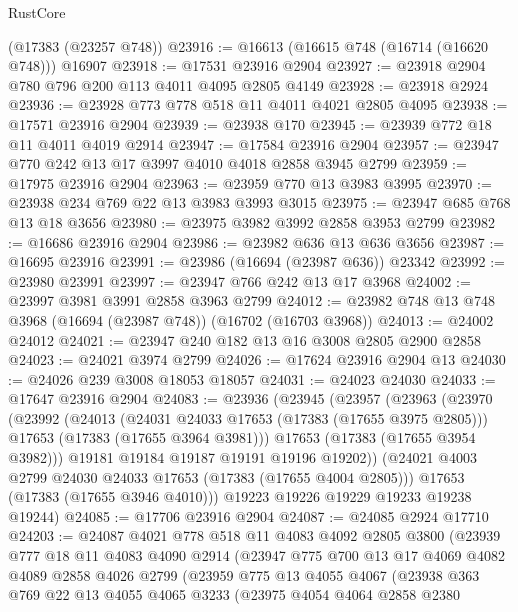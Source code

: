 \begin{lexlean}{RustCore}
\begin{coremodule}
    (@17383 (@23257 @748))
@23916 := @16613 (@16615 @748 (@16714 (@16620 @748))) @16907
@23918 := @17531 @23916 @2904
@23927 := @23918 @2904 @780 @796 @200 @113 @4011 @4095 @2805 @4149
@23928 := @23918 @2924
@23936 := @23928 @773 @778 @518 @11 @4011 @4021 @2805 @4095
@23938 := @17571 @23916 @2904
@23939 := @23938 @170
@23945 := @23939 @772 @18 @11 @4011 @4019 @2914
@23947 := @17584 @23916 @2904
@23957 := @23947 @770 @242 @13 @17 @3997 @4010 @4018 @2858 @3945 @2799
@23959 := @17975 @23916 @2904
@23963 := @23959 @770 @13 @3983 @3995
@23970 := @23938 @234 @769 @22 @13 @3983 @3993 @3015
@23975 := @23947 @685 @768 @13 @18 @3656
@23980 := @23975 @3982 @3992 @2858 @3953 @2799
@23982 := @16686 @23916 @2904
@23986 := @23982 @636 @13 @636 @3656
@23987 := @16695 @23916
@23991 := @23986 (@16694 (@23987 @636)) @23342
@23992 := @23980 @23991
@23997 := @23947 @766 @242 @13 @17 @3968
@24002 := @23997 @3981 @3991 @2858 @3963 @2799
@24012 := @23982 @748 @13 @748 @3968 (@16694 (@23987 @748)) (@16702 (@16703 @3968))
@24013 := @24002 @24012
@24021 := @23947 @240 @182 @13 @16 @3008 @2805 @2900 @2858
@24023 := @24021 @3974 @2799
@24026 := @17624 @23916 @2904 @13
@24030 := @24026 @239 @3008 @18053 @18057
@24031 := @24023 @24030
@24033 := @17647 @23916 @2904
@24083 := @23936
    (@23945
      (@23957
        (@23963
          (@23970
            (@23992
              (@24013
                (@24031 @24033 @17653 (@17383 (@17655 @3975 @2805)))
                @17653
                (@17383 (@17655 @3964 @3981)))
              @17653
              (@17383 (@17655 @3954 @3982)))
            @19181
            @19184
            @19187
            @19191
            @19196
            @19202))
        (@24021 @4003 @2799 @24030 @24033 @17653 (@17383 (@17655 @4004 @2805)))
        @17653
        (@17383 (@17655 @3946 @4010)))
      @19223
      @19226
      @19229
      @19233
      @19238
      @19244)
@24085 := @17706 @23916 @2904
@24087 := @24085 @2924 @17710
@24203 := @24087
    @4021
    @778
    @518
    @11
    @4083
    @4092
    @2805
    @3800
    (@23939
      @777
      @18
      @11
      @4083
      @4090
      @2914
      (@23947
        @775
        @700
        @13
        @17
        @4069
        @4082
        @4089
        @2858
        @4026
        @2799
        (@23959
          @775
          @13
          @4055
          @4067
          (@23938
            @363
            @769
            @22
            @13
            @4055
            @4065
            @3233
            (@23975
              @4054
              @4064
              @2858
              @2380

\end{coremodule}
\end{lexlean}
